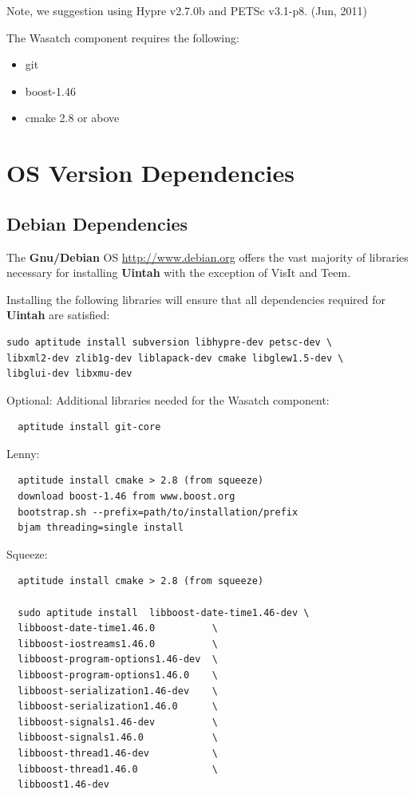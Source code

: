 \documentclass[12pt]{article}
\begin{document}
Note, we suggestion using Hypre v2.7.0b and PETSc v3.1-p8.  (Jun, 2011)

The Wasatch component requires the following:
\begin{itemize}
  \item git
  \item boost-1.46
  \item cmake 2.8 or above
\end{itemize}
\section{OS Version Dependencies}

\subsection{Debian Dependencies}
\label{sec:debian_dependencies}
The \textbf{Gnu/Debian} OS \url{http://www.debian.org} offers the vast majority of libraries necessary for
installing \textbf{Uintah} with the exception of VisIt and Teem.

Installing the following libraries will ensure that all dependencies
required for \textbf{Uintah} are satisfied: 

\begin{verbatim} 
sudo aptitude install subversion libhypre-dev petsc-dev \ 
libxml2-dev zlib1g-dev liblapack-dev cmake libglew1.5-dev \
libglui-dev libxmu-dev
\end{verbatim}

\noindent Optional: Additional libraries needed for the Wasatch component:
\begin{verbatim}
  aptitude install git-core
\end{verbatim}  
 \hspace{0.125in}Lenny:
\begin{verbatim}
  aptitude install cmake > 2.8 (from squeeze)
  download boost-1.46 from www.boost.org
  bootstrap.sh --prefix=path/to/installation/prefix
  bjam threading=single install
\end{verbatim}
\hspace{0.125in}Squeeze:
\begin{verbatim}
  aptitude install cmake > 2.8 (from squeeze)
  
  sudo aptitude install  libboost-date-time1.46-dev \
  libboost-date-time1.46.0          \
  libboost-iostreams1.46.0          \   
  libboost-program-options1.46-dev  \
  libboost-program-options1.46.0    \
  libboost-serialization1.46-dev    \
  libboost-serialization1.46.0      \
  libboost-signals1.46-dev          \
  libboost-signals1.46.0            \
  libboost-thread1.46-dev           \
  libboost-thread1.46.0             \
  libboost1.46-dev
\end{verbatim}
\end{document}
